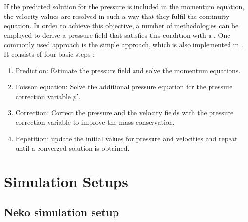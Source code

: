 If the predicted solution for the pressure is included in the momentum equation, the velocity values are resolved in such a way that they fulfil the continuity equation.
In order to achieve this objective, a  number of  methodologies can be employed
 to derive a pressure field that satisfies this condition with a  \citep{schlatter_lecture_2025, weller_tensorial_1998}.
One  commonly used  approach is the \acrfull{simple} approach, which is also implemented in .
It consists of four basic steps \citep{schlatter_lecture_2025}:
\begin{enumerate}
    \item Prediction: Estimate the pressure field and solve the momentum equations.
    \item Poisson equation: Solve the additional pressure equation for the  pressure correction variable $p'$.
    \item Correction: Correct the pressure and the velocity fields with the pressure correction variable to improve the mass conservation.
    \item Repetition: update the initial values for  pressure and velocities and repeat until a converged solution is obtained.
\end{enumerate}







 



\section{Simulation Setups}\label{sec:MethodCurvedTBL}

\subsection{Neko simulation setup}

